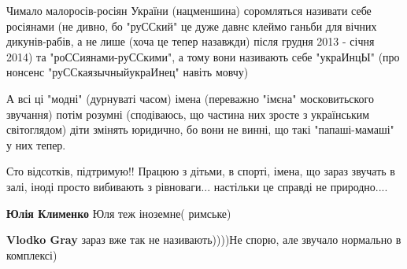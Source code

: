 \begin{itemize}
 

Чимало малоросів-росіян України (нацменшина) соромляться називати себе
росіянами (не дивно, бо "руССкий" це дуже давнє клеймо ганьби для вічних
дикунів-рабів, а не лише (хоча це тепер назавжди) після грудня 2013 - січня
2014) та "роССиянами-руССкими", а тому вони називають себе "украИнцЫ" (про
нонсенс "руССкаязычныйукраИнец" навіть мовчу) 🤦🏻‍♂️ 🚯

А всі ці "модні" (дурнуваті часом) імена (переважно "імєна" московитьского
звучання) потім розумні (сподіваюсь, що частина них зросте з українським
світоглядом) діти змінять юридично, бо вони не винні, що такі "папаші-мамаші" у
них тепер.


 

Сто відсотків, підтримую!! Працюю з дітьми, в спорті, імена, що зараз звучать в
залі, іноді просто вибивають з рівноваги... настільки це справді не природно....

\begin{itemize}
 
\textbf{Юлія Клименко}
Юля теж іноземне( римське)

 
\textbf{Vlodko Gray} зараз вже так не називають))))Не спорю, але звучало нормально в комплексі)
\end{itemize}

 

\end{itemize}
